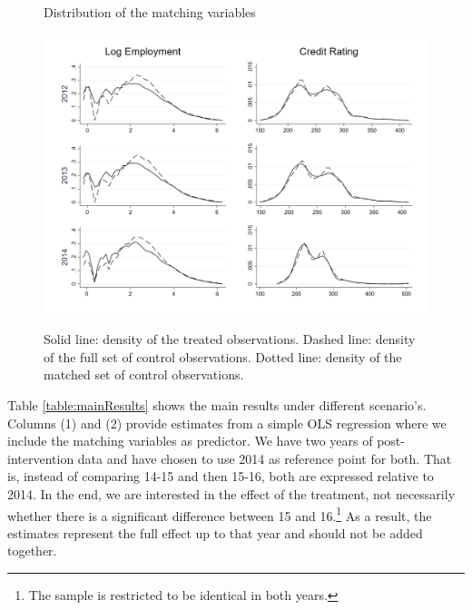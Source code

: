 \begin{figure}[htbp]
    \centering
    \caption{Distribution of the matching variables}
    \includegraphics[width=0.70\paperwidth]{Images/summaryStats_graphs.png}
    \label{fig:sumStats}
    \caption*{Solid line: density of the treated observations. Dashed line: density of the full set of control observations. Dotted line: density of the matched set of control observations.}
\end{figure}
Table \ref{table:mainResults} shows the main results under different scenario's. Columns (1) and (2) provide estimates from a simple OLS regression where we include the matching variables as predictor. We have two years of post-intervention data and have chosen to use 2014 as reference point for both. That is, instead of comparing 14-15 and then 15-16, both are expressed relative to 2014. In the end, we are interested in the effect of the treatment, not necessarily whether there is a significant difference between 15 and 16.\footnote{The sample is restricted to be identical in both years.} As a result, the estimates represent the full effect up to that year and should not be added together.

